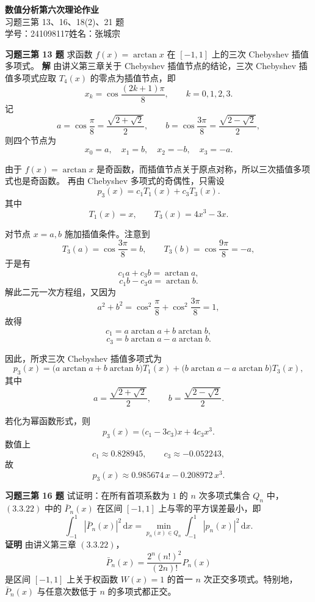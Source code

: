 \documentclass[UTF8,a4paper,11pt]{ctexart}
\begin{document}
\begin{center}
  {\LARGE\bfseries 数值分析\quad 第六次理论作业}\\[6pt]
  {\large 习题三第 13、16、18(2)、21 题}\\[4pt]
  {\normalsize 学号：241098117\quad 姓名：张城宗}
\end{center}

\bigskip

\noindent\textbf{习题三\quad 第 13 题}\quad
求函数 $f(x)=\arctan x$ 在 $[-1,1]$ 上的三次 Chebyshev 插值多项式。
\medskip
\noindent\textbf{解}\quad
由讲义第三章关于 Chebyshev 插值节点的结论，三次 Chebyshev 插值多项式应取
$T_4(x)$ 的零点为插值节点，即
\[
  x_k=\cos\frac{(2k+1)\pi}{8},\qquad k=0,1,2,3.
\]
记
\[
  a=\cos\frac{\pi}{8}=\frac{\sqrt{2+\sqrt2}}{2},\qquad
  b=\cos\frac{3\pi}{8}=\frac{\sqrt{2-\sqrt2}}{2},
\]
则四个节点为
\[
  x_0=a,\quad x_1=b,\quad x_2=-b,\quad x_3=-a.
\]

由于 $f(x)=\arctan x$ 是奇函数，而插值节点关于原点对称，所以三次插值多项式也是奇函数。
再由 Chebyshev 多项式的奇偶性，只需设
\[
  p_3(x)=c_1T_1(x)+c_3T_3(x).
\]
其中
\[
  T_1(x)=x,\qquad T_3(x)=4x^3-3x.
\]

对节点 $x=a,b$ 施加插值条件。注意到
\[
  T_3(a)=\cos\frac{3\pi}{8}=b,\qquad
  T_3(b)=\cos\frac{9\pi}{8}=-a,
\]
于是有
\[
  c_1a+c_3b=\arctan a,
\]
\[
  c_1b-c_3a=\arctan b.
\]
解此二元一次方程组，又因为
\[
  a^2+b^2=\cos^2\frac{\pi}{8}+\cos^2\frac{3\pi}{8}=1,
\]
故得
\[
  c_1=a\arctan a+b\arctan b,
\]
\[
  c_3=b\arctan a-a\arctan b.
\]

因此，所求三次 Chebyshev 插值多项式为
\[
  \boxed{
  p_3(x)=\bigl(a\arctan a+b\arctan b\bigr)T_1(x)
  +\bigl(b\arctan a-a\arctan b\bigr)T_3(x),}
\]
其中
\[
  a=\frac{\sqrt{2+\sqrt2}}{2},\qquad b=\frac{\sqrt{2-\sqrt2}}{2}.
\]

若化为幂函数形式，则
\[
  p_3(x)=\bigl(c_1-3c_3\bigr)x+4c_3x^3.
\]
数值上
\[
  c_1\approx 0.828945,\qquad c_3\approx -0.052243,
\]
故
\[
  \boxed{p_3(x)\approx 0.985674\,x-0.208972\,x^3.}
\]

\bigskip\bigskip

\noindent\textbf{习题三\quad 第 16 题}\quad
试证明：在所有首项系数为 $1$ 的 $n$ 次多项式集合 $Q_n$ 中，$(3.3.22)$ 中的
$\bar P_n(x)$ 在区间 $[-1,1]$ 上与零的平方误差最小，即
\[
  \int_{-1}^1 |\bar P_n(x)|^2\,\mathrm{d}x
  =
  \min_{p_n(x)\in Q_n}\int_{-1}^1 |p_n(x)|^2\,\mathrm{d}x.
\]
\medskip
\noindent\textbf{证明}\quad
由讲义第三章 $(3.3.22)$，
\[
  \bar P_n(x)=\frac{2^n(n!)^2}{(2n)!}P_n(x)
\]
是区间 $[-1,1]$ 上关于权函数 $W(x)=1$ 的首一 $n$ 次正交多项式。特别地，
$\bar P_n(x)$ 与任意次数低于 $n$ 的多项式都正交。
\end{document}

